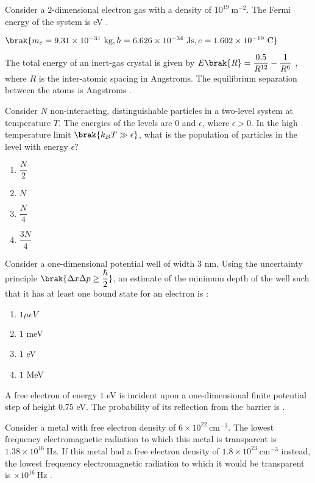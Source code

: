 \item Consider a $2$-dimensional electron gas with a density of $10^{19}~\text{m}^{-2}$. The Fermi energy of the system is eV . 

$\brak{m_e = 9.31 \times 10^{-31}~\text{kg}, h = 6.626 \times 10^{-34}~\text{Js}, e = 1.602 \times 10^{-19}~\text{C}}$

\item The total energy of an inert-gas crystal is given by $E\brak{R} = \dfrac{0.5}{R^{12}} - \dfrac{1}{R^6}$ , where $R$ is the inter-atomic spacing in Angstroms. The equilibrium separation between the atoms is Angstroms .

\item Consider $N$ non-interacting, distinguishable particles in a two-level system at temperature $T$. The energies of the levels are $0$ and  
 $\epsilon$, where $\epsilon > 0$. In the high temperature limit $\brak{k_B T \gg \epsilon}$, what is the population of particles in the level with energy $\epsilon$?

\begin{enumerate}
    \item $\dfrac{N}{2}$
    \item $N$
    \item $\dfrac{N}{4}$
    \item $\dfrac{3N}{4}$
\end{enumerate}

\item Consider a one-dimensional potential well of width $3$ nm. Using the uncertainty principle $\brak{\Delta x \Delta p \geq \dfrac{\hbar}{2}}$, an estimate of the minimum depth of the well such that it has at least one bound state for an electron is :

\begin{enumerate}
    \item $1 \mu eV$
    \item $1$ meV
    \item $1$ eV
    \item $1$ MeV
\end{enumerate}

\item A free electron of energy $1$ eV is incident upon a one-dimensional finite potential step of height $0.75$ eV. The probability of its reflection from the barrier is .

 \item Consider a metal with free electron density of $6 \times 10^{22}~\text{cm}^{-3}$. The lowest frequency electromagnetic radiation to which this metal is transparent is $1.38 \times 10^{16}~\text{Hz}$. If this metal had a free electron density of $1.8 \times 10^{23}~\text{cm}^{-3}$ instead, the lowest frequency electromagnetic radiation to which it would be transparent is  $\times 10^{16}~\text{Hz}$ .

